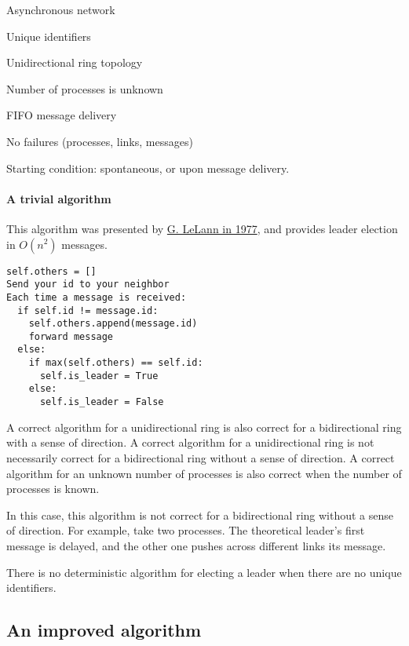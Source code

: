 \documentclass{idc_msc}
\begin{document}
\begin{itemize*}
  \item Asynchronous network
  \item Unique identifiers
  \item Unidirectional ring topology
  \item Number of processes is unknown
  \item FIFO message delivery
  \item No failures (processes, links, messages)
  \item Starting condition: spontaneous, or upon message delivery.
\end{itemize*}

\paragraph{A trivial algorithm}

This algorithm was presented by \href{https://www-rocq.inria.fr/novaltis/publications/IFIP%20Congress%201977.pdf}{G. LeLann in 1977}, and provides leader election in $O(n^2)$ messages.

\begin{lstlisting}[frame=L,mathescape=true,title={For processes $i=1...n$}]
self.others = []
Send your id to your neighbor
Each time a message is received:
  if self.id != message.id:
    self.others.append(message.id)
    forward message
  else:
    if max(self.others) == self.id:
      self.is_leader = True
    else:
      self.is_leader = False
\end{lstlisting}

A correct algorithm for a unidirectional ring is also correct for a bidirectional ring with a sense of direction.
A correct algorithm for a unidirectional ring is not necessarily correct for a bidirectional ring without a sense of direction.
A correct algorithm for an unknown number of processes is also correct when the number of processes is known.

In this case, this algorithm is not correct for a bidirectional ring without a sense of direction.
For example, take two processes. The theoretical leader's first message is delayed, and the other one pushes across different links its message.

There is no deterministic algorithm for electing a leader when there are no unique identifiers.

\subsection{An improved algorithm}
\end{document}
